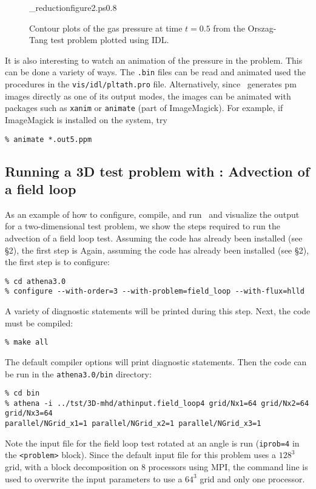 \begin{figure}[htb!]
\plotone_reduction{figure2.ps}{0.8}
\caption{Contour plots of the gas pressure at time $t=0.5$ from
the Orszag-Tang test problem plotted using IDL.}
\end{figure}

It is also interesting to watch an animation of the pressure in the problem.
This can be done a variety of ways.  The {\tt .bin} files can be read and
animated used the procedures in the {\tt vis/idl/pltath.pro} file.
Alternatively, since \ath\ generates pm images directly as one of its
output modes, the images can be animated with packages such as {\tt xanim}
or {\tt animate} (part of ImageMagick).  For example, if ImageMagick is
installed on the system, try
\begin{verbatim}
% animate *.out5.ppm
\end{verbatim}

\subsection{Running a 3D test problem with \ath: Advection of a field loop}

As an example of how to configure, compile, and run \ath\ and visualize
the output for a two-dimensional test problem, we show the steps required 
to run the advection of a field loop test.
Assuming the code has already been installed (see \S2), the first step is
Again, assuming the code has already been
installed (see \S2), the first step is to configure:
\begin{verbatim}
% cd athena3.0
% configure --with-order=3 --with-problem=field_loop --with-flux=hlld
\end{verbatim}
A variety of diagnostic statements will be printed during
this step.  Next, the code must be compiled:
\begin{verbatim}
% make all
\end{verbatim}
The default compiler options will print diagnostic statements.  Then
the code can be run in the {\tt athena3.0/bin} directory: 
\begin{verbatim}
% cd bin
% athena -i ../tst/3D-mhd/athinput.field_loop4 grid/Nx1=64 grid/Nx2=64 grid/Nx3=64
parallel/NGrid_x1=1 parallel/NGrid_x2=1 parallel/NGrid_x3=1
\end{verbatim}
Note the input file for the field loop test rotated at an angle is run
({\tt iprob=4} in the {\tt <problem>} block).  Since the
default input file for this problem uses a $128^3$ grid, with a block
decomposition on 8 processors using MPI, the command line is used to overwrite
the input parameters to use a $64^3$ grid and only one processor.

